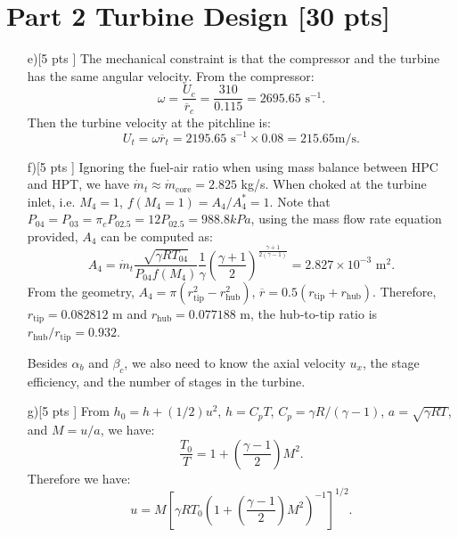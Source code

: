 \documentclass[12pt]{article}
\begin{document}
\section{Part 2 Turbine Design [30 pts]}
\begin{itemize}
	\item[e)[5 pts]]
	The mechanical constraint is that the compressor and the turbine has the same angular velocity. From the compressor:
	\begin{equation}
		\omega = \frac{U_c}{\overline{r}_c} = \frac{310}{0.115} = 2695.65\text{ s}^{-1}.
	\end{equation}
	Then the turbine velocity at the pitchline is:
	\begin{equation}
		U_t = \omega \overline{r}_t = 2195.65\text{ s}^{-1}\times 0.08 = 215.65\text{m/s}.
	\end{equation}
	
	\item[f)[5 pts]]
	Ignoring the fuel-air ratio when using mass balance between HPC and HPT, we have $\dot{m}_t \approx \dot{m}_\text{core}=2.825$ kg/s. When choked at the turbine inlet, i.e. $M_4 = 1$, $f(M_4=1)=A_4/A^*_4=1$. Note that $P_{04} = P_{03} = \pi_c P_{02.5}=12P_{02.5} = 988.8kPa$, using the mass flow rate equation provided, $A_4$ can be computed as:
	\begin{equation}
		A_4 = \dot{m}_t \frac{\sqrt{\gamma R T_{04}}}{P_{04}f(M_4)}\frac{1}{\gamma}\left( \frac{\gamma + 1}{2}\right)^{\frac{\gamma + 1}{2\left( \gamma - 1\right)}} = 2.827\times 10^{-3}\text{ m}^2.
	\end{equation}
	From the geometry, $A_4 = \pi \left(r^2_\text{tip} - r^2_\text{hub}\right)$, $\overline{r} = 0.5\left(r_\text{tip} + r_\text{hub}\right)$. Therefore, $r_\text{tip} = 0.082812$ m and $r_\text{hub} = 0.077188$ m, the hub-to-tip ratio is $r_\text{hub}/r_\text{tip} = 0.932$.
	
	Besides $\alpha_b$ and $\beta_c$, we also need to know the axial velocity $u_x$, the stage efficiency, and the number of stages in the turbine.
	
	\item[g)[5 pts]]
	From $h_0 = h + (1/2) u^2$, $h = C_p T$, $C_p = \gamma R/(\gamma - 1)$, $a = \sqrt{\gamma R T}$, and $M = u / a$, we have:
	\begin{equation}
		\frac{T_0}{T} = 1 + \left(\frac{\gamma - 1}{2}\right) M^2.
	\end{equation}
	Therefore we have:
	\begin{equation}
		u = M \left[\gamma R T_0\left(1 + \left(\frac{\gamma - 1}{2}\right) M^2\right)^{-1}\right]^{1/2}.
		\label{eq:u_M}
	\end{equation}
	

\end{itemize}
\end{document}

